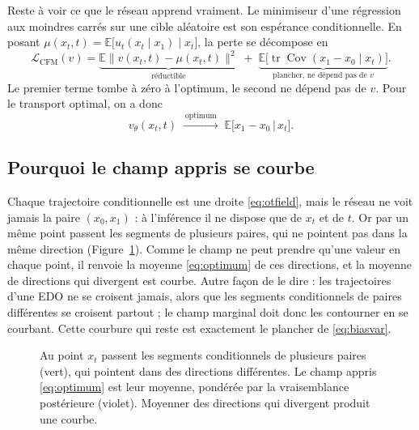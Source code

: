 \documentclass[11pt]{article}
\begin{document}
Reste à voir ce que le réseau apprend vraiment. Le minimiseur d'une régression aux moindres carrés sur une
cible aléatoire est son espérance conditionnelle. En posant $\mu(x_t,t) = \mathbb{E}\big[u_t(x_t\mid x_1)
\mid x_t\big]$, la perte se décompose en
\begin{equation}
\mathcal{L}_{\text{CFM}}(v) = \underbrace{\mathbb{E}\big\lVert v(x_t,t) - \mu(x_t,t)\big\rVert^2}_{\text{réductible}}
\;+\; \underbrace{\mathbb{E}\big[\operatorname{tr}\operatorname{Cov}(x_1 - x_0 \mid x_t)\big]}_{\text{plancher, ne dépend pas de } v}.
\label{eq:biasvar}
\end{equation}
Le premier terme tombe à zéro à l'optimum, le second ne dépend pas de $v$. Pour le transport optimal, on a
donc
\begin{equation}
v_\theta(x_t, t) \;\xrightarrow{\ \text{optimum}\ }\; \mathbb{E}\big[x_1 - x_0 \,\big|\, x_t\big].
\label{eq:optimum}
\end{equation}

\subsection{Pourquoi le champ appris se courbe}
\label{sec:curve}

Chaque trajectoire conditionnelle est une droite \eqref{eq:otfield}, mais le réseau ne voit jamais la paire
$(x_0,x_1)$ : à l'inférence il ne dispose que de $x_t$ et de $t$. Or par un même point passent les segments de
plusieurs paires, qui ne pointent pas dans la même direction (Figure~\ref{fig:condmarg}). Comme le champ ne
peut prendre qu'une valeur en chaque point, il renvoie la moyenne \eqref{eq:optimum} de ces directions, et la
moyenne de directions qui divergent est courbe. Autre façon de le dire : les trajectoires d'une EDO ne se
croisent jamais, alors que les segments conditionnels de paires différentes se croisent partout ; le champ
marginal doit donc les contourner en se courbant. Cette courbure qui reste est exactement le plancher de
\eqref{eq:biasvar}.

\begin{figure}[htbp]
\centering
{}
\caption{Au point $x_t$ passent les segments conditionnels de plusieurs paires (vert), qui pointent dans des
directions différentes. Le champ appris \eqref{eq:optimum} est leur moyenne, pondérée par la vraisemblance
postérieure (violet). Moyenner des directions qui divergent produit une courbe.}
\label{fig:condmarg}
\end{figure}
\end{document}
